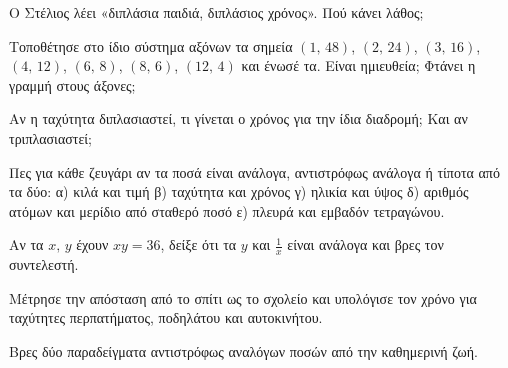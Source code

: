 \ex Ο Στέλιος λέει «διπλάσια παιδιά, διπλάσιος χρόνος». Πού κάνει λάθος;

\ex Τοποθέτησε στο ίδιο σύστημα αξόνων τα σημεία $(1,\,48)$, $(2,\,24)$, $(3,\,16)$, $(4,\,12)$, $(6,\,8)$, $(8,\,6)$, $(12,\,4)$ και ένωσέ τα. Είναι ημιευθεία; Φτάνει η γραμμή στους άξονες;

\ex Αν η ταχύτητα διπλασιαστεί, τι γίνεται ο χρόνος για την ίδια διαδρομή; Και αν τριπλασιαστεί;

\ex Πες για κάθε ζευγάρι αν τα ποσά είναι ανάλογα, αντιστρόφως ανάλογα ή τίποτα από τα δύο: α) κιλά και τιμή \quad β) ταχύτητα και χρόνος \quad γ) ηλικία και ύψος \quad δ) αριθμός ατόμων και μερίδιο από σταθερό ποσό \quad ε) πλευρά και εμβαδόν τετραγώνου.

\ex Αν τα $x,\,y$ έχουν $xy=36$, δείξε ότι τα $y$ και $\frac{1}{x}$ είναι ανάλογα και βρες τον συντελεστή.


\ex Μέτρησε την απόσταση από το σπίτι ως το σχολείο και υπολόγισε τον χρόνο για ταχύτητες περπατήματος, ποδηλάτου και αυτοκινήτου.

\ex Βρες δύο παραδείγματα αντιστρόφως αναλόγων ποσών από την καθημερινή ζωή.
